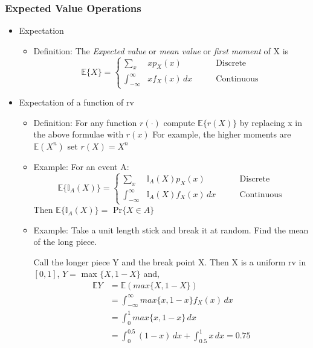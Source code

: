 \documentclass[12pt]{article}
\begin{document}
\subsubsection{Expected Value Operations}
\begin{itemize}
\item Expectation 
\begin{itemize}
\item Definition: The \textit{Expected value } or \textit{mean value} or \textit{first moment } of X is 
  \[
    \mathbb{E}\{X\}=\left\{
                \begin{array}{lll}
                  \sum_x & xp_X(x)  \qquad &\textrm{Discrete}\\
                  \int_{-\infty}^{\infty} & xf_X(x) \, dx \qquad &\textrm{Continuous}
                \end{array}
              \right.
  \]

\end{itemize}

\item Expectation of a function of rv 
\begin{itemize}
\item Definition: For any function $r(\cdot)$ compute $\mathbb{E}\{r(X)\}$ by replacing x in the above formulae with $r(x)$ For example, the higher moments are $\mathbb{E}(X^n)$ set $r(X)=X^n$
\item Example: For an event A:
  \[
    \mathbb{E}\{\mathbb{I}_A(X)\}=\left\{
                \begin{array}{lll}
                  \sum_x &\mathbb{I}_A(X)p_X(x)  \qquad &\textrm{Discrete}\\
                  \int_{-\infty}^{\infty}&\mathbb{I}_A(X)f_X(x) \, dx \qquad &\textrm{Continuous}
                \end{array}
              \right.
  \]
Then $\mathbb{E}\{\mathbb{I}_A(X)\} =$ Pr$\{X \in A\}$

\item Example: Take a unit length stick and break it at random. Find the mean of the long piece.

Call the longer piece Y and the break point X. Then X is a uniform rv in $[0,1]$, $Y =$ max $\{X, 1-X \}$ and,
\begin{align*}
\mathbb{E}{Y} &= \mathbb{E}(max\{X, 1-X \}) \\
& = \int_{-\infty}^{\infty}max\{x, 1-x \} f_X(x) \, dx \\
& = \int_0^1 max\{x, 1-x\} \, dx \\
& = \int_0^0.5 (1-x) \, dx + \int_0.5^1 x \, dx = 0.75
\end{align*}


\end{itemize}
\end{itemize}
\end{document}
